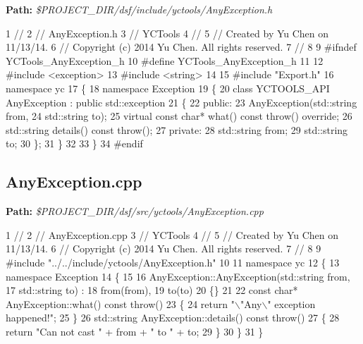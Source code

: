{\bfseries Path\+:} {\itshape \$\+P\+R\+O\+J\+E\+C\+T\+\_\+\+D\+I\+R/dsf/include/yctools/\+Any\+Exception.h} 
\begin{DoxyCodeInclude}
1 \textcolor{comment}{//}
2 \textcolor{comment}{//  AnyException.h}
3 \textcolor{comment}{//  YCTools}
4 \textcolor{comment}{//}
5 \textcolor{comment}{//  Created by Yu Chen on 11/13/14.}
6 \textcolor{comment}{//  Copyright (c) 2014 Yu Chen. All rights reserved.}
7 \textcolor{comment}{//}
8 
9 \textcolor{preprocessor}{#ifndef YCTools\_AnyException\_h}
10 \textcolor{preprocessor}{#define YCTools\_AnyException\_h}
11 
12 \textcolor{preprocessor}{#include <exception>}
13 \textcolor{preprocessor}{#include <string>}
14 
15 \textcolor{preprocessor}{#include "Export.h"}
16 \textcolor{keyword}{namespace }yc
17 \{
18     \textcolor{keyword}{namespace }Exception
19     \{
20         \textcolor{keyword}{class }YCTOOLS\_API AnyException : \textcolor{keyword}{public} std::exception
21         \{
22         \textcolor{keyword}{public}:
23             AnyException(std::string from,
24                          std::string to);
25             \textcolor{keyword}{virtual} \textcolor{keyword}{const} \textcolor{keywordtype}{char}* what() \textcolor{keyword}{const} throw() override;
26             std::\textcolor{keywordtype}{string} details() const throw();
27         private:
28             std::\textcolor{keywordtype}{string} from;
29             std::\textcolor{keywordtype}{string} to;
30         \};
31     \}
32     
33 \}
34 \textcolor{preprocessor}{#endif}
\end{DoxyCodeInclude}
 \hypertarget{yctools_yctoolsAnyException_cpp}{}\subsection{Any\+Exception.\+cpp}\label{yctools_yctoolsAnyException_cpp}
{\bfseries Path\+:} {\itshape \$\+P\+R\+O\+J\+E\+C\+T\+\_\+\+D\+I\+R/dsf/src/yctools/\+Any\+Exception.cpp} 
\begin{DoxyCodeInclude}
1 \textcolor{comment}{//}
2 \textcolor{comment}{//  AnyException.cpp}
3 \textcolor{comment}{//  YCTools}
4 \textcolor{comment}{//}
5 \textcolor{comment}{//  Created by Yu Chen on 11/13/14.}
6 \textcolor{comment}{//  Copyright (c) 2014 Yu Chen. All rights reserved.}
7 \textcolor{comment}{//}
8 
9 \textcolor{preprocessor}{#include "../../include/yctools/AnyException.h"}
10 
11 \textcolor{keyword}{namespace }yc
12 \{
13     \textcolor{keyword}{namespace }Exception
14     \{
15         
16         AnyException::AnyException(std::string from,
17                                    std::string to) :
18             from(from),
19             to(to)
20         \{\}
21         
22         \textcolor{keyword}{const} \textcolor{keywordtype}{char}* AnyException::what() \textcolor{keyword}{const} throw()
23         \{
24             \textcolor{keywordflow}{return} \textcolor{stringliteral}{"\(\backslash\)"Any\(\backslash\)" exception happened!"};
25         \}
26         std::string AnyException::details() \textcolor{keyword}{const} throw()
27         \{
28             \textcolor{keywordflow}{return} \textcolor{stringliteral}{"Can not cast "} + from + \textcolor{stringliteral}{" to "} + to;
29         \}
30     \}
31 \}
\end{DoxyCodeInclude}

